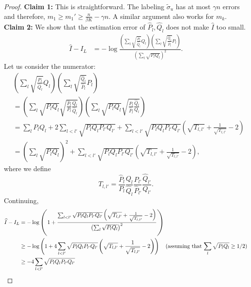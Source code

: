 \documentclass{article}
\begin{document}
\begin{proof}
\noindent \textbf{Claim 1:} This is straightforward. The labeling $\tilde \sigma_u$ has at most $\gamma n$ errors and therefore, $m_1 \geq m_1' \geq \frac{n}{\beta K} - \gamma n$. A similar argument also works for $m_k$.\\

\noindent \textbf{Claim 2:} We show that the estimation error of $\hat{P}_l, \hat{Q}_l$ does not make $\hat{I}$ too small.
\begin{align}
\hat{I} - I_L &= - \log \frac{ 
     \left( \sum_l \sqrt{\frac{\hat{P}_l}{\hat{Q}_l}} Q_l \right)
     \left( \sum_l \sqrt{\frac{\hat{Q}_l}{\hat{P}_l}} P_l \right)}{ 
          \left( \sum_l \sqrt{P_l Q_l} \right)^2 }. \label{eqn:Ihat_Istar}
\end{align}
Let us consider the numerator:
\begin{align*}
& \left( \sum_l \sqrt{ \frac{\hat{P}_l}{\hat{Q}_l}} Q_l \right)
\left( \sum_l \sqrt{ \frac{\hat{Q}_l}{\hat{P}_l}} P_l \right) \\
&= \left( \sum_l \sqrt{ P_l Q_l} \sqrt{ \frac{\hat{P}_l}{P_l} \frac{Q_l}{\hat{Q}_l}} \right) 
     \left( \sum_l \sqrt{P_l Q_l} \sqrt{ \frac{P_l}{\hat{P}_l} \frac{\hat{Q}_l}{ Q_l}} \right) \\
&= \sum_l P_l Q_l + 2\sum_{l < l'} \sqrt{P_l Q_l P_{l'} Q_{l'}} + 
   \sum_{l < l'} \sqrt{P_l Q_l P_{l'} Q_{l'}} \left( \sqrt{T_{l,l'}} + \frac{1}{\sqrt{T_{l,l'}}} - 2 \right) \\
&= \left( \sum_l \sqrt{P_l Q_l} \right)^2 + \sum_{l < l'} 
                  \sqrt{P_l Q_l P_{l'} Q_{l'}} \left( \sqrt{T_{l,l'}} + \frac{1}{\sqrt{T_{l,l'}}} - 2 \right), 
\end{align*}
where we define 
$$T_{l,l'} = \frac{\hat{P}_l}{P_l} \frac{Q_l}{\hat{Q}_l} \frac{P_{l'}}{\hat{P}_{l'}} \frac{\hat{Q}_{l'}}{Q_{l'}}.$$
Continuing,
\begin{align}
\hat{I} - I_L &= - \log \left( 1 + \frac{ \sum_{l<l'} \sqrt{P_l Q_l P_{l'} Q_{l'}} 
    \left( \sqrt{T_{l,l'}} + \frac{1}{\sqrt{T_{l,l'}}} - 2 \right)}
    { \left( \sum_l \sqrt{ P_l Q_l} \right)^2 }  \right) \nonumber \\
     &  \geq  - \log \left( 1 + 4 \sum_{l<l'} \sqrt{P_l Q_l P_{l'} Q_{l'}}  
    \left( \sqrt{T_{l,l'}} + \frac{1}{\sqrt{T_{l,l'}}} - 2 \right)  \right) 
  \quad \trm{(assuming that $\sum_l \sqrt{P_l Q_l} \geq 1/2$)} \nonumber \\
   & \geq - 4 \sum_{l < l'} \sqrt{P_l Q_l P_{l'} Q_{l'}} 

\end{align}
\end{proof}
\end{document}
